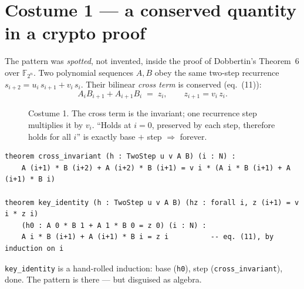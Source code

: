 \documentclass[runningheads]{llncs}
\begin{document}
\section{Costume 1 --- a conserved quantity in a crypto proof}

The pattern was \emph{spotted}, not invented, inside the proof of Dobbertin's
Theorem~6 over $\mathbb{F}_{2^n}$. Two polynomial sequences $A,B$ obey the same
two-step recurrence $s_{i+2}=u_i\,s_{i+1}+v_i\,s_i$. Their bilinear
\emph{cross term} is conserved (eq.~(11)):
\[
  A_i B_{i+1} + A_{i+1} B_i \;=\; z_i, \qquad z_{i+1}=v_i\, z_i .
\]

\begin{figure}[H]
\centering
{}
\caption{Costume 1. The cross term is the invariant; one recurrence step
multiplies it by $v_i$. ``Holds at $i=0$, preserved by each step, therefore
holds for all $i$'' is exactly base $+$ step $\Rightarrow$ forever.}
\label{fig:crypto}
\end{figure}

\begin{lstlisting}[style=lean]
theorem cross_invariant (h : TwoStep u v A B) (i : N) :
    A (i+1) * B (i+2) + A (i+2) * B (i+1) = v i * (A i * B (i+1) + A (i+1) * B i)

theorem key_identity (h : TwoStep u v A B) (hz : forall i, z (i+1) = v i * z i)
    (h0 : A 0 * B 1 + A 1 * B 0 = z 0) (i : N) :
    A i * B (i+1) + A (i+1) * B i = z i          -- eq. (11), by induction on i
\end{lstlisting}

\noindent
\lstinline[style=lean]|key_identity| is a hand-rolled induction: base
(\lstinline[style=lean]|h0|), step (\lstinline[style=lean]|cross_invariant|),
done. The pattern is there --- but disguised as algebra.
\end{document}
